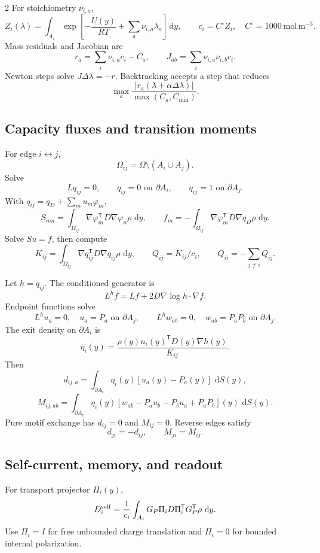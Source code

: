 \documentclass[10pt]{article}
\newcommand{\dd}{\,\mathrm d}
\newcommand{\T}{\mathsf{T}}
\newcommand{\molm}{\mathrm{mol\,m^{-3}}}
\begin{document}
\begin{multicols}{2}
For stoichiometry \(\nu_{i,a}\),
\[
Z_i(\lambda)
=
\int_{A_i}
\exp\!\left[
-\frac{U(y)}{RT}+\sum_a\nu_{i,a}\lambda_a
\right]\dd y,
\qquad
c_i=C^\circ Z_i,\quad C^\circ=1000\ \molm.
\]
Mass residuals and Jacobian are
\[
r_a=\sum_i\nu_{i,a}c_i-C_a,
\qquad
J_{ab}=\sum_i\nu_{i,a}\nu_{i,b}c_i.
\]
Newton steps solve \(J\Delta\lambda=-r\). Backtracking accepts a step that
reduces
\[
\max_a\frac{|r_a(\lambda+\alpha\Delta\lambda)|}
{\max(C_a,C_{\min})}.
\]

\subsection{Capacity fluxes and transition moments}

For edge \(i\leftrightarrow j\),
\[
\Omega_{ij}=\Omega\setminus(A_i\cup A_j).
\]
Solve
\[
Lq_{ij}=0,\qquad
q_{ij}=0\text{ on }\partial A_i,\qquad
q_{ij}=1\text{ on }\partial A_j.
\]
With \(q_{ij}=q_D+\sum_mu_m\varphi_m\),
\[
S_{mn}=
\int_{\Omega_{ij}}
\nabla\varphi_m^\T D\nabla\varphi_n\rho\,\dd y,
\qquad
f_m=
-\int_{\Omega_{ij}}
\nabla\varphi_m^\T D\nabla q_D\rho\,\dd y.
\]
Solve \(Su=f\), then compute
\[
K_{ij}=
\int_{\Omega_{ij}}
\nabla q_{ij}^\T D\nabla q_{ij}\rho\,\dd y,
\qquad
Q_{ij}=K_{ij}/c_i,
\qquad
Q_{ii}=-\sum_{j\ne i}Q_{ij}.
\]

Let \(h=q_{ij}\). The conditioned generator is
\[
L^h f=Lf+2D\nabla\log h\cdot\nabla f.
\]
Endpoint functions solve
\[
L^h u_a=0,\quad u_a=P_a\text{ on }\partial A_j,
\qquad
L^h w_{ab}=0,\quad w_{ab}=P_aP_b\text{ on }\partial A_j.
\]
The exit density on \(\partial A_i\) is
\[
\eta_i(y)=
\frac{\rho(y)n_i(y)^\T D(y)\nabla h(y)}{K_{ij}}.
\]
Then
\[
d_{ij,a}
=
\int_{\partial A_i}\eta_i(y)[u_a(y)-P_a(y)]\,\dd S(y),
\]
\[
M_{ij,ab}
=
\int_{\partial A_i}\eta_i(y)
[w_{ab}-P_au_b-P_bu_a+P_aP_b](y)\,\dd S(y).
\]
Pure motif exchange has \(d_{ij}=0\) and \(M_{ij}=0\). Reverse edges satisfy
\[
d_{ji}=-d_{ij},
\qquad
M_{ji}=M_{ij}.
\]

\subsection{Self-current, memory, and readout}

For transport projector \(\Pi_i(y)\),
\[
D_i^{\rm self}
=
\frac1{c_i}
\int_{A_i}
G_P\Pi_iD\Pi_i^\T G_P^\T\rho\,\dd y.
\]
Use \(\Pi_i=I\) for free unbounded charge translation and \(\Pi_i=0\) for
bounded internal polarization.


\end{multicols}
\end{document}
